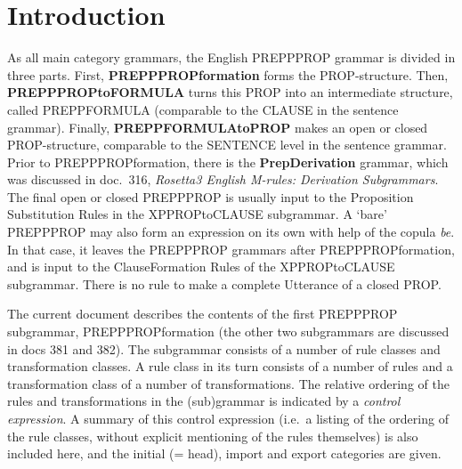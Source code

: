 
   \RosSupersedes{-}
   \MakeRosTitle
%
%

\section{Introduction}
As all main category grammars, the English PREPPPROP grammar is divided in 
three parts. First, {\bf PREPPPROPformation} forms the PROP-structure. Then, {
\bf PREPPPROPtoFORMULA} turns this PROP into an intermediate structure, called 
PREPPFORMULA
(comparable to the CLAUSE in the sentence grammar). Finally, {\bf 
PREPPFORMULAtoPROP} makes an open or closed PROP-structure, comparable to the 
SENTENCE level in the sentence grammar. Prior to PREPPPROPformation, there is 
the {\bf PrepDerivation} grammar, which was discussed in doc.\ 316, {\em 
Rosetta3 English M-rules: Derivation Subgrammars\/}. The final open or closed 
PREPPPROP is usually input to the Proposition Substitution Rules in the 
XPPROPtoCLAUSE subgrammar. A `bare' PREPPPROP may also form an expression on 
its own with help of the copula {\em be\/}. In that case, it leaves the 
PREPPPROP grammars after PREPPPROPformation, and 
is input to the ClauseFormation Rules of the XPPROPtoCLAUSE subgrammar. 
There is no rule to make a complete Utterance of a closed PROP.

The current document describes the contents of the first PREPPPROP subgrammar, 
PREPPPROPformation (the other two subgrammars are discussed in docs 381 and 
382). The subgrammar consists of 
a number of rule classes and transformation classes. A rule class in its turn
consists of a number of rules and a transformation class of a number of 
transformations. The relative ordering of the rules and transformations in the
(sub)grammar is indicated by a {\em control expression}. A summary of this
control expression (i.e.\ a listing of the ordering of the rule classes, 
without explicit mentioning of the rules themselves) is also included here, 
and the initial (= head), import and export categories are given. 

